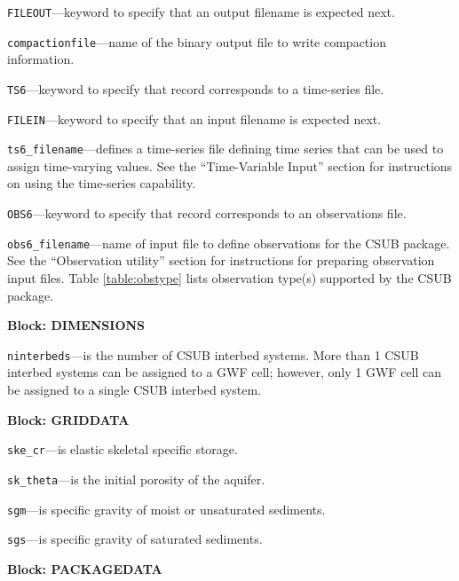 \begin{description}
\item \texttt{FILEOUT}---keyword to specify that an output filename is expected next.

\item \texttt{compactionfile}---name of the binary output file to write compaction information.

\item \texttt{TS6}---keyword to specify that record corresponds to a time-series file.

\item \texttt{FILEIN}---keyword to specify that an input filename is expected next.

\item \texttt{ts6\_filename}---defines a time-series file defining time series that can be used to assign time-varying values. See the ``Time-Variable Input'' section for instructions on using the time-series capability.

\item \texttt{OBS6}---keyword to specify that record corresponds to an observations file.

\item \texttt{obs6\_filename}---name of input file to define observations for the CSUB package. See the ``Observation utility'' section for instructions for preparing observation input files. Table \ref{table:obstype} lists observation type(s) supported by the CSUB package.

\end{description}
\item \textbf{Block: DIMENSIONS}

\begin{description}
\item \texttt{ninterbeds}---is the number of CSUB interbed systems.  More than 1 CSUB interbed systems can be assigned to a GWF cell; however, only 1 GWF cell can be assigned to a single CSUB interbed system.

\end{description}
\item \textbf{Block: GRIDDATA}

\begin{description}
\item \texttt{ske\_cr}---is elastic skeletal specific storage.

\item \texttt{sk\_theta}---is the initial porosity of the aquifer.

\item \texttt{sgm}---is specific gravity of moist or unsaturated sediments.

\item \texttt{sgs}---is specific gravity of saturated sediments.

\end{description}
\item \textbf{Block: PACKAGEDATA}

